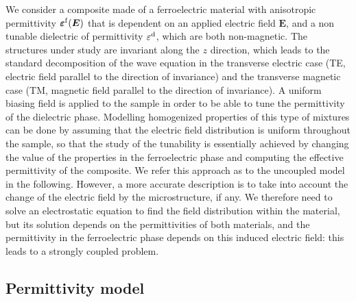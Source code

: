 \documentclass[openacc]{rsproca_new}%
\newcommand{\B}{\boldsymbol}
\newcommand{\tens}[1]{\B{#1}}
\newcommand{\epsftens}{\tens{\varepsilon}^{\rm f}}
\newcommand{\epsd}{\varepsilon^{\rm d}}
\begin{document}
We consider a composite made of a ferroelectric material with anisotropic
permittivity $\epsftens(\B E)$
that is dependent on an applied electric field $\B E$,
and a non tunable dielectric of permittivity $\epsd$, which are both non-magnetic.
The structures under study are invariant along the $z$ direction, which leads to the standard decomposition
of the wave equation in the transverse electric case (TE, electric field parallel
 to the direction of invariance) and the
transverse magnetic case (TM, magnetic field parallel to the direction
of invariance).
A uniform biasing field is applied to the sample in order to be able to tune the
permittivity of the dielectric phase.
Modelling homogenized properties of this type of mixtures can be done by assuming
that the electric field distribution is uniform throughout the sample,
so that the study of the tunability is
essentially achieved by changing the value of the properties in the ferroelectric phase and computing
 the effective permittivity
of the composite. We refer this approach as to the uncoupled model in the following.
However, a more accurate description is to take into account the change of the
electric field by the microstructure, if any. We therefore need to solve an
electrostatic equation to find the field distribution within the material, but its solution
depends on the permittivities of both materials, and the permittivity in the
ferroelectric phase depends on this induced electric field: this leads to a strongly coupled problem.\\

\subsection{Permittivity model\label{permmodel}}
\end{document}
